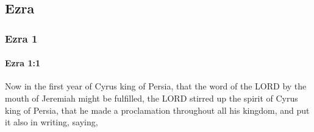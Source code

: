 \subsection{Ezra}
	\label{EZRA}

	\subsubsection{Ezra 1} %
		\label{EZRA-1}

		\paragraph{Ezra 1:1} %
			\label{EZRA-1-1}

			Now in the first year of Cyrus king of Persia, that the word of the LORD by the mouth of Jeremiah might be fulfilled, the LORD stirred up the spirit of Cyrus king of Persia, that he made a proclamation throughout all his kingdom, and put it also in writing, saying,

